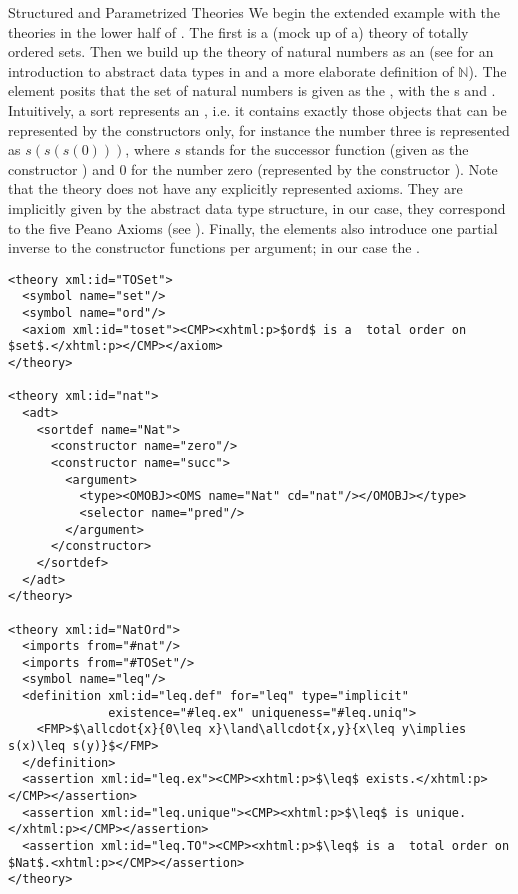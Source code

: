 \begin{tchapter}[id=natlist]{Structured and Parametrized Theories}
We begin the extended example with the theories in the lower half of
{}.  The first is a (mock up of a) theory of totally
ordered sets. Then we build up the theory of natural numbers as an
{} (see {} for an introduction to abstract
data types in {\omdoc} and a more elaborate definition of $\mathbb N$). The
{} element posits that the set of natural numbers is given as the
{} {}, with the {s} {} and
{}. Intuitively, a sort represents an {},
i.e. it contains exactly those objects that can be represented by the constructors only,
for instance the number three is represented as $s(s(s(0)))$, where $s$ stands for the
successor function (given as the constructor {}) and $0$ for the number zero
(represented by the constructor {}). Note that the theory {}
does not have any explicitly represented axioms. They are implicitly given by the abstract
data type structure, in our case, they correspond to the five Peano Axioms (see
{}).  Finally, the {} elements also introduce one
partial inverse to the constructor functions per argument; in our case the
{}.

\begin{lstlisting}[mathescape,label=lst:nat-param,
  index={theory,symbol,definition,assertion}]
<theory xml:id="TOSet">                   
  <symbol name="set"/>
  <symbol name="ord"/>
  <axiom xml:id="toset"><CMP><xhtml:p>$ord$ is a  total order on $set$.</xhtml:p></CMP></axiom>
</theory>                               

<theory xml:id="nat">
  <adt>
    <sortdef name="Nat">
      <constructor name="zero"/>
      <constructor name="succ">
        <argument>
          <type><OMOBJ><OMS name="Nat" cd="nat"/></OMOBJ></type>
          <selector name="pred"/>
        </argument>
      </constructor>
    </sortdef>
  </adt>
</theory>

<theory xml:id="NatOrd">
  <imports from="#nat"/>
  <imports from="#TOSet"/>
  <symbol name="leq"/>
  <definition xml:id="leq.def" for="leq" type="implicit" 
              existence="#leq.ex" uniqueness="#leq.uniq">
    <FMP>$\allcdot{x}{0\leq x}\land\allcdot{x,y}{x\leq y\implies s(x)\leq s(y)}$</FMP>
  </definition>
  <assertion xml:id="leq.ex"><CMP><xhtml:p>$\leq$ exists.</xhtml:p></CMP></assertion>
  <assertion xml:id="leq.unique"><CMP><xhtml:p>$\leq$ is unique.</xhtml:p></CMP></assertion>
  <assertion xml:id="leq.TO"><CMP><xhtml:p>$\leq$ is a  total order on $Nat$.<xhtml:p></CMP></assertion>
</theory>                       
\end{lstlisting}


\end{tchapter}
